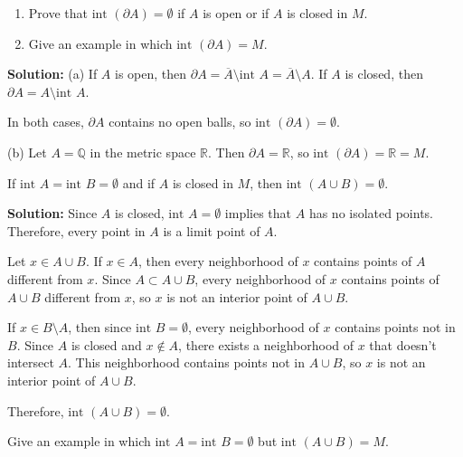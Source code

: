 \begin{problembox}
\begin{enumerate}[label=\alph*)]
\item Prove that \(\text{int } (\partial A) = \emptyset\) if \( A \) is open or if \( A \) is closed in \( M \).
\item Give an example in which \(\text{int } (\partial A) = M\).
\end{enumerate}
\end{problembox}

\textbf{Solution:} 
(a) If $A$ is open, then $\partial A = \overline{A} \setminus \text{int } A = \overline{A} \setminus A$. If $A$ is closed, then $\partial A = A \setminus \text{int } A$.

In both cases, $\partial A$ contains no open balls, so $\text{int } (\partial A) = \emptyset$.

(b) Let $A = \mathbb{Q}$ in the metric space $\mathbb{R}$. Then $\partial A = \mathbb{R}$, so $\text{int } (\partial A) = \mathbb{R} = M$.

\begin{problembox}
If \(\text{int } A = \text{int } B = \emptyset\) and if \(A\) is closed in \(M\), then \(\text{int } (A \cup B) = \emptyset\).
\end{problembox}

\textbf{Solution:} Since $A$ is closed, $\text{int } A = \emptyset$ implies that $A$ has no isolated points. Therefore, every point in $A$ is a limit point of $A$.

Let $x \in A \cup B$. If $x \in A$, then every neighborhood of $x$ contains points of $A$ different from $x$. Since $A \subset A \cup B$, every neighborhood of $x$ contains points of $A \cup B$ different from $x$, so $x$ is not an interior point of $A \cup B$.

If $x \in B \setminus A$, then since $\text{int } B = \emptyset$, every neighborhood of $x$ contains points not in $B$. Since $A$ is closed and $x \notin A$, there exists a neighborhood of $x$ that doesn't intersect $A$. This neighborhood contains points not in $A \cup B$, so $x$ is not an interior point of $A \cup B$.

Therefore, $\text{int } (A \cup B) = \emptyset$.

\begin{problembox}
Give an example in which \(\text{int } A = \text{int } B = \emptyset\) but \(\text{int } (A \cup B) = M\).
\end{problembox}


